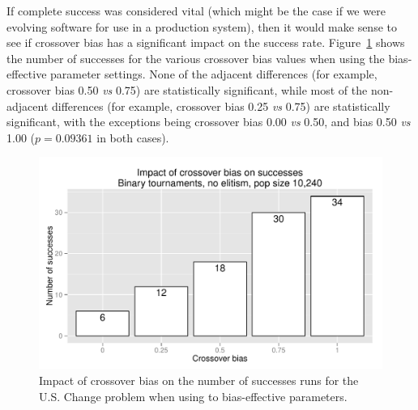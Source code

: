 \documentclass{sig-alternate}
\begin{document}
%
%
%
%

If complete success was considered vital (which might be the case if we were evolving software for use in a production
system), then it would make sense to see if crossover bias has a significant impact on the success rate.
Figure~\ref{fig:USChange_Successes_strong} shows the number of successes for the various crossover bias values when
using the bias-effective parameter settings. None of the adjacent differences (for example, crossover bias 0.50
\emph{vs} 0.75) are statistically significant, while most of the non-adjacent differences (for example, crossover bias
0.25 \emph{vs} 0.75) are statistically significant, with the exceptions being crossover bias 0.00 \emph{vs} 0.50, and
bias 0.50 \emph{vs} 1.00 ($p=0.09361$ in both cases).

\begin{figure}
\centering
\includegraphics[width=0.45 \textwidth]{Plots/US_change_successes_strong.pdf}
\caption{Impact of crossover bias on the number of successes runs for the U.S. Change problem when using to
bias-effective parameters.}
\label{fig:USChange_Successes_strong}
\end{figure}

%
%
%
%

\end{document}
